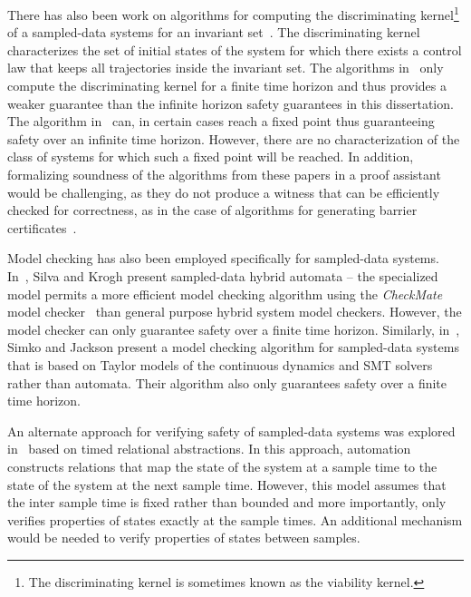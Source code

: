 There has also been work on algorithms for computing the discriminating
kernel\footnote{The discriminating kernel is sometimes known as the
  viability kernel.} of a sampled-data systems for an invariant
set~\cite{mitchell2015improved,mitchell2013safety,Gillula14sampled}. The
discriminating kernel characterizes the set of initial states of the system
for which there exists a control law that keeps all trajectories inside the
invariant set.  The algorithms
in~\cite{mitchell2015improved,Gillula14sampled} only compute the
discriminating kernel for a finite time horizon and thus provides a weaker
guarantee than the infinite horizon safety guarantees in this
dissertation. The algorithm in~\cite{mitchell2013safety} can, in certain
cases reach a fixed point thus guaranteeing safety over an infinite time
horizon. However, there are no characterization of the class of systems for
which such a fixed point will be reached. In addition, formalizing
soundness of the algorithms from these papers in a proof assistant would be
challenging, as they do not produce a witness that can be efficiently
checked for correctness, as in the case of algorithms for generating
barrier certificates~\cite{Dai17revisited,kong2013barrier,Zeng16barrier}.

Model checking has also been employed specifically for sampled-data
systems. In~\cite{silva01sampled}, Silva and Krogh present sampled-data
hybrid automata -- the specialized model permits a more efficient model
checking algorithm using the \emph{CheckMate} model
checker~\cite{silva2000modeling} than general purpose hybrid system model
checkers. However, the model checker can only guarantee safety over a
finite time horizon. Similarly, in~\cite{simko14bmc}, Simko and Jackson
present a model checking algorithm for sampled-data systems that is based
on Taylor models of the continuous dynamics and SMT solvers rather than
automata. Their algorithm also only guarantees safety over a finite time
horizon.

An alternate approach for verifying safety of sampled-data systems was
explored in~\cite{Zutshi12sampled} based on timed relational
abstractions. In this approach, automation constructs relations that map
the state of the system at a sample time to the state of the system at the
next sample time. However, this model assumes that the inter sample time is
fixed rather than bounded and more importantly, only verifies properties of
states exactly at the sample times. An additional mechanism would be needed
to verify properties of states between samples.
